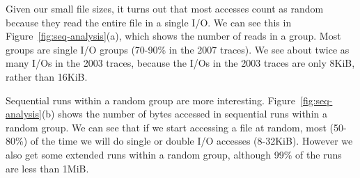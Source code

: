 Given our small file sizes, it turns out that most accesses count as
random because they read the entire file in a single I/O.  We can see
this in Figure~\ref{fig:seq-analysis}(a), which shows the number of
reads in a group.  Most groups are single I/O groups (70-90\% in the
2007 traces).  We see about twice as many I/Os in the 2003 traces,
because the I/Os in the 2003 traces are only 8KiB, rather than 16KiB.

Sequential runs within a random group are more
interesting.  Figure~\ref{fig:seq-analysis}(b) shows the number of
bytes accessed in sequential runs within a
random group.  We can see that if we start accessing a file at random,
most (50-80\%) of the time we will do single or double I/O accesses (8-32KiB).
However we also get some extended runs within a
random group, although 99\% of the runs are less than 1MiB.





